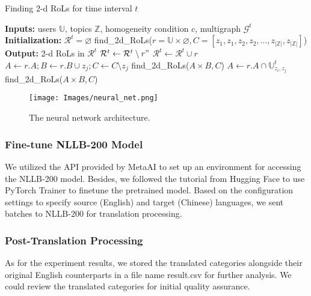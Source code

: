 \documentclass[sigconf]{acmart}
\begin{document}
\begin{algorithm}[t]
\caption{Finding 2-d RoLs for time interval $t$}
\label{bicluster}
\begin{algorithmic}[1]
\Statex\textbf{Inputs:} 
\Statex\hspace{\algorithmicindent} users $\mathbb{U}$, topics $\mathbb{Z}$, homogeneity condition $c$, multigraph $\mathcal{G}^t$ \Statex\textbf{Initialization:}
\Statex\hspace{\algorithmicindent} $\mathcal{R}^t=\varnothing$
\Statex\hspace{\algorithmicindent} find\_2d\_RoLs($r=\mathbb{U}\times\varnothing,C=[z_1,z_1,z_2,z_2,...,z_{|\mathbb{Z}|},z_{|\mathbb{Z}|}]$)
\Statex\textbf{Output:} 2-d RoLs in $\mathcal{R}^t$
\State $\mathcal{R}^t\leftarrow\mathcal{R}^t\setminus{r"}$
\EndIf
\EndFor
\State $\mathcal{R}^t\leftarrow\mathcal{R}^t\cup{r}$\label{c}
\EndIf
{}
\State $A\leftarrow{r.A};B\leftarrow{r.B\cup{z_j}};C\leftarrow{C\setminus{z_j}}$
\State find\_2d\_RoLs($A\times{B},C$)\label{a}
\Else
{}
\State $A\leftarrow{r.A}\cap{\mathbb{U}^t_{z_i,z_j}}$\label{b}
\State find\_2d\_RoLs($A\times{B},C$)\label{z}
\EndFor
\EndFor
\EndIf
\EndFor
\EndProcedure
\end{algorithmic}
\end{algorithm}



\begin{figure}[t]
\centering
\texttt{[image: Images/neural\_net.png]}
\caption{The neural network architecture.\label{neural_net}}
\end{figure}

\subsubsection{Fine-tune NLLB-200 Model}
We utilized the API provided by MetaAI to set up an environment for accessing the NLLB-200 model. Besides, we followed the tutorial from Hugging Face to use PyTorch Trainer to finetune the pretrained model. Based on the configuration settings to specify source (English) and target (Chinese) languages, we sent batches to NLLB-200 for translation processing.

\subsubsection{Post-Translation Processing}
As for the experiment results, we stored the translated categories alongside their original English counterparts in a file name result.csv for further analysis. We could review the translated categories for initial quality assurance. 
\end{document}
